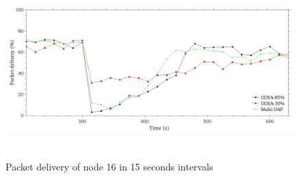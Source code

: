 \documentclass[conference]{IEEEtran}
\begin{document}
\begin{figure}[ht]
  \centering
  \mbox{
    \label{pdf-n16-per}{\includegraphics[scale=.21]{IEEE-consolidados/G-pdf-periodo-n16-2.jpg}}
  }
  \caption{Packet delivery of node 16 in 15 seconds intervals}
  \label{pdf-n16-per}
\end{figure}
\end{document}
